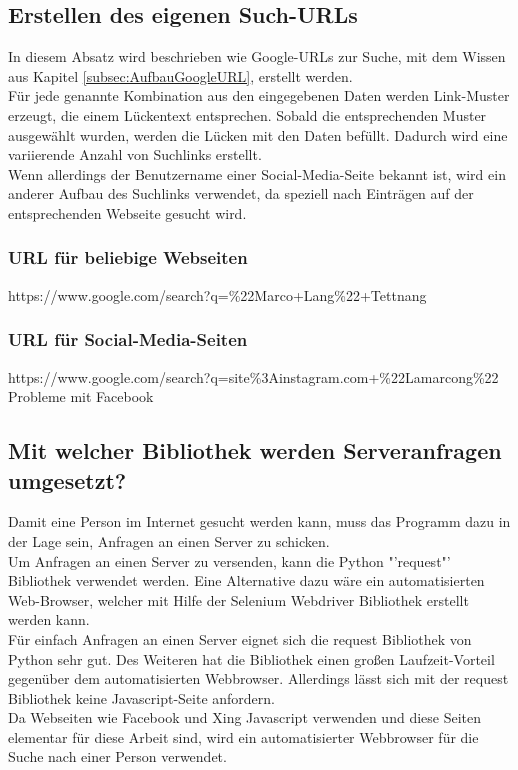 	\subsection{Erstellen des eigenen Such-URLs}
	In diesem Absatz wird beschrieben wie Google-URLs zur Suche, mit dem Wissen aus Kapitel \ref{subsec:AufbauGoogleURL}, erstellt werden.\\
	Für jede genannte Kombination aus den eingegebenen Daten werden Link-Muster erzeugt, die einem Lückentext entsprechen. Sobald die entsprechenden Muster ausgewählt wurden, werden die Lücken mit den Daten befüllt. Dadurch wird eine variierende Anzahl von Suchlinks erstellt.\\
	Wenn allerdings der Benutzername einer Social-Media-Seite bekannt ist, wird ein anderer Aufbau des Suchlinks verwendet, da speziell nach Einträgen auf der entsprechenden Webseite gesucht wird.
	
	\subsubsection{URL für beliebige Webseiten}
	https://www.google.com/search?q=\%22Marco+Lang\%22+Tettnang
	\subsubsection{URL für Social-Media-Seiten}
	https://www.google.com/search?q=site\%3Ainstagram.com+\%22Lamarcong\%22
	\\Probleme mit Facebook

	
		
	
	\subsection{Mit welcher Bibliothek werden Serveranfragen umgesetzt?}
	Damit eine Person im Internet gesucht werden kann, muss das Programm dazu in der Lage sein, Anfragen an einen Server zu schicken. \\
	Um Anfragen an einen Server zu versenden, kann die Python "'request"' Bibliothek verwendet werden. Eine Alternative dazu wäre ein automatisierten Web-Browser, welcher mit Hilfe der Selenium Webdriver Bibliothek erstellt werden kann.\\
	Für einfach Anfragen an einen Server eignet sich die request Bibliothek von Python sehr gut. Des Weiteren hat die Bibliothek einen großen Laufzeit-Vorteil gegenüber dem automatisierten Webbrowser. Allerdings lässt sich mit der request Bibliothek keine Javascript-Seite anfordern.\\
	Da Webseiten wie Facebook und Xing Javascript verwenden und diese Seiten elementar für diese Arbeit sind, wird ein automatisierter Webbrowser für die Suche nach einer Person verwendet.

